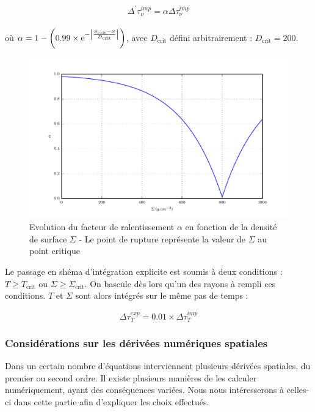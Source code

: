 \begin{equation}
	\Delta^{'} \tau_{\nu}^{imp} = \alpha \Delta \tau_{\nu}^{imp}
\end{equation} \\

où $\alpha = 1 - \left( 0.99 \times \e^{- \left| \frac{S_\textrm{crit} - S}{D_\textrm{crit}} \right|} \right)$, avec $D_\textrm{crit}$ défini arbitrairement : $D_\textrm{crit} = 200$.


\begin{figure}
  \includegraphics{figures/alpha_fonction_de_sigma.pdf}
  \caption{Evolution du facteur de ralentissement $\alpha$ en fonction de la densité de surface $\Sigma$ - Le point de rupture représente la valeur de $\Sigma$ au point critique}
\end{figure}

Le passage en shéma d'intégration explicite est soumis à deux conditions : $T
\ge T_\textrm{crit}$ ou $\Sigma \ge \Sigma_\textrm{crit}$. On bascule dès lors
qu'un des rayons à rempli ces conditions. $T$ et $\Sigma$ sont alors intégrés
sur le même pas de temps :

\begin{equation}
\Delta \tau_{T}^{exp} = 0.01 \times \Delta \tau_{T}^{imp}
\end{equation}

\subsubsection{Considérations sur les dérivées numériques spatiales}

Dans un certain nombre d’équations interviennent plusieurs dérivées spatiales,
du premier ou second ordre. Il existe plusieurs manières de les calculer
numériquement, ayant des conséquences variées. Nous nous intéresserons à
celles-ci dans cette partie afin d’expliquer les choix effectués.


